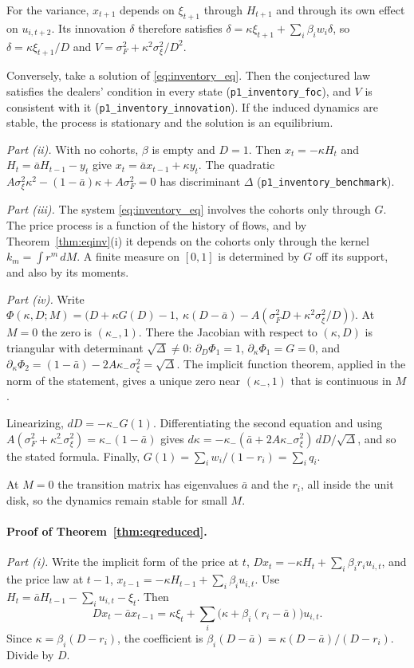 For the variance, $x_{t+1}$ depends on $\xi_{t+1}$ through $H_{t+1}$ and through its own effect on $u_{i,t+2}$. Its innovation $\delta$ therefore satisfies $\delta=\kappa\xi_{t+1}+\sum_i\beta_iw_i\delta$, so $\delta=\kappa\xi_{t+1}/D$ and $V=\sigma_F^2+\kappa^2\sigma_\xi^2/D^2$.

Conversely, take a solution of \eqref{eq:inventory_eq}. Then the conjectured law satisfies the dealers' condition in every state (\nolinkurl{p1_inventory_foc}), and $V$ is consistent with it (\nolinkurl{p1_inventory_innovation}). If the induced dynamics are stable, the process is stationary and the solution is an equilibrium.

\emph{Part (ii).} With no cohorts, $\beta$ is empty and $D=1$. Then $x_t=-\kappa H_t$ and $H_t=\bar aH_{t-1}-y_t$ give $x_t=\bar ax_{t-1}+\kappa y_t$. The quadratic $A\sigma_\xi^2\kappa^2-(1-\bar a)\kappa+A\sigma_F^2=0$ has discriminant $\Delta$ (\nolinkurl{p1_inventory_benchmark}).

\emph{Part (iii).} The system \eqref{eq:inventory_eq} involves the cohorts only through $G$. The price process is a function of the history of flows, and by Theorem~\ref{thm:eqinv}(i) it depends on the cohorts only through the kernel $k_m=\int r^m\,dM$. A finite measure on $[0,1]$ is determined by $G$ off its support, and also by its moments.

\emph{Part (iv).} Write $\Phi(\kappa,D;M)=\bigl(D+\kappa G(D)-1,\ \kappa(D-\bar a)-A(\sigma_F^2D+\kappa^2\sigma_\xi^2/D)\bigr)$. At $M=0$ the zero is $(\kappa_-,1)$. There the Jacobian with respect to $(\kappa,D)$ is triangular with determinant $\sqrt\Delta\ne0$: $\partial_D\Phi_1=1$, $\partial_\kappa\Phi_1=G=0$, and $\partial_\kappa\Phi_2=(1-\bar a)-2A\kappa_-\sigma_\xi^2=\sqrt\Delta$. The implicit function theorem, applied in the norm of the statement, gives a unique zero near $(\kappa_-,1)$ that is continuous in $M$.

Linearizing, $dD=-\kappa_-G(1)$. Differentiating the second equation and using $A(\sigma_F^2+\kappa_-^2\sigma_\xi^2)=\kappa_-(1-\bar a)$ gives $d\kappa=-\kappa_-(\bar a+2A\kappa_-\sigma_\xi^2)\,dD/\sqrt\Delta$, and so the stated formula. Finally, $G(1)=\sum_iw_i/(1-r_i)=\sum_iq_i$.

At $M=0$ the transition matrix has eigenvalues $\bar a$ and the $r_i$, all inside the unit disk, so the dynamics remain stable for small $M$.

\paragraph{Proof of Theorem~\ref{thm:eqreduced}.}
\emph{Part (i).} Write the implicit form of the price at $t$, $Dx_t=-\kappa H_t+\sum_i\beta_ir_iu_{i,t}$, and the price law at $t-1$, $x_{t-1}=-\kappa H_{t-1}+\sum_i\beta_iu_{i,t}$. Use $H_t=\bar aH_{t-1}-\sum_iu_{i,t}-\xi_t$. Then
\[
 Dx_t-\bar ax_{t-1}=\kappa\xi_t+\sum_i\bigl(\kappa+\beta_i(r_i-\bar a)\bigr)u_{i,t}.
\]
Since $\kappa=\beta_i(D-r_i)$, the coefficient is $\beta_i(D-\bar a)=\kappa(D-\bar a)/(D-r_i)$. Divide by $D$.


